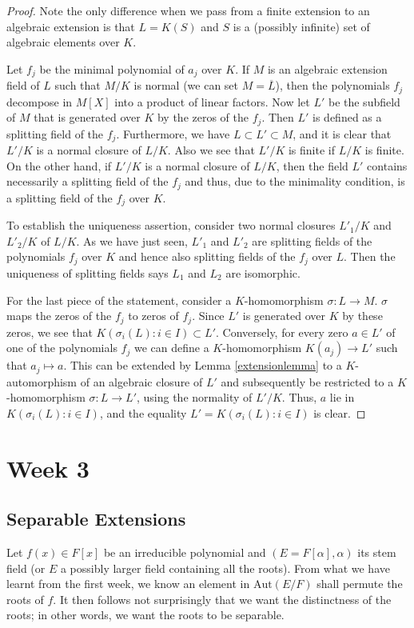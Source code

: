 \documentclass[12pt]{report}
\theoremstyle{definition}
\newcommand{\Aut}{\text{Aut}}
\begin{document}
\begin{proof}
	Note the only difference when we pass from a finite extension to an algebraic extension is that $L=K(S)$ and $S$ is a (possibly infinite) set of algebraic elements over $K$.

	Let $f_j$ be the minimal polynomial of $a_j$ over $K$. If $M$ is an algebraic extension field of $L$ such that $M/K$ is normal (we can set $M=\overline{L}$), then the polynomials $f_j$ decompose in $M[X]$ into a product of linear factors. Now let $L'$ be the subfield of $M$ that is generated over $K$ by the zeros of the $f_j$. Then $L'$ is defined as a splitting field of the $f_j$. Furthermore, we have $L \subset L' \subset M$, and it is clear that $L'/K$ is a normal closure of $L/K$. Also we see that $L'/K$ is finite if $L/K$ is finite. On the other hand, if $L'/K$ is a normal closure of $L/K$, then the field $L'$ contains necessarily a splitting field of the $f_j$ and thus, due to the minimality condition, is a splitting field of the $f_j$ over $K$.


	To establish the uniqueness assertion, consider two normal closures $L'_1/K$ and $L'_2/K$ of $L/K$. As we have just seen, $L'_1$ and $L'_2$ are splitting fields of the polynomials $f_j$ over $K$ and hence also splitting fields of the $f_j$ over $L$. Then the uniqueness of splitting fields says $L_1$ and $L_2$ are isomorphic.


	For the last piece of the statement, consider a $K$-homomorphism $\sigma : L \to M$. $\sigma$ maps the zeros of the $f_j$ to zeros of $f_j$. Since $L'$ is generated over $K$ by these zeros, we see that $K(\sigma_i(L): i \in I) \subset L'$. Conversely, for every zero $a \in L'$ of one of the polynomials $f_j$ we can define a $K$-homomorphism $K(a_j) \to L'$ such that $a_j \mapsto a$. This can be extended by Lemma \ref{extensionlemma} to a $K$-automorphism of an algebraic closure of $L'$ and subsequently be restricted to a $K$-homomorphism $\sigma : L \to L'$, using the normality of $L'/K$. Thus, $a$ lie in $K(\sigma_i(L): i \in I)$, and the equality $L' = K(\sigma_i(L): i \in I)$ is clear.
\end{proof}

\chapter*{Week 3}
\setcounter{chapter}{3}

\section{Separable Extensions}
Let $f(x)\in F[x]$ be an irreducible polynomial and $(E=F[\alpha],\alpha)$ its stem field (or $E$ a possibly larger field containing all the roots). From what we have learnt from the first week, we know an element in $\Aut(E/F)$ shall permute the roots of $f$. It then follows not surprisingly that we want the distinctness of the roots; in other words, we want the roots to be separable.
\end{document}
